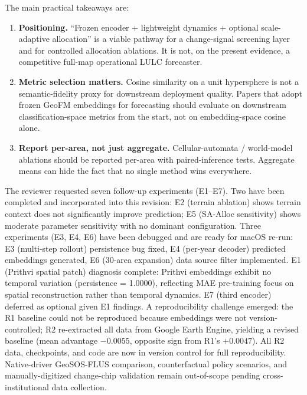 \documentclass{article}
\begin{document}
The main practical takeaways are:

\begin{enumerate}
\item \textbf{Positioning.} ``Frozen encoder + lightweight dynamics + optional scale-adaptive allocation'' is a viable pathway for a change-signal screening layer and for controlled allocation ablations. It is not, on the present evidence, a competitive full-map operational LULC forecaster.
\item \textbf{Metric selection matters.} Cosine similarity on a unit hypersphere is not a semantic-fidelity proxy for downstream deployment quality. Papers that adopt frozen GeoFM embeddings for forecasting should evaluate on downstream classification-space metrics from the start, not on embedding-space cosine alone.
\item \textbf{Report per-area, not just aggregate.} Cellular-automata / world-model ablations should be reported per-area with paired-inference tests. Aggregate means can hide the fact that no single method wins everywhere.
\end{enumerate}

The reviewer requested seven follow-up experiments (E1--E7). Two have been completed and incorporated into this revision: E2 (terrain ablation) shows terrain context does not significantly improve prediction; E5 (SA-Alloc sensitivity) shows moderate parameter sensitivity with no dominant configuration. Three experiments (E3, E4, E6) have been debugged and are ready for macOS re-run: E3 (multi-step rollout) persistence bug fixed, E4 (per-year decoder) predicted embeddings generated, E6 (30-area expansion) data source filter implemented. E1 (Prithvi spatial patch) diagnosis complete: Prithvi embeddings exhibit no temporal variation (persistence = 1.0000), reflecting MAE pre-training focus on spatial reconstruction rather than temporal dynamics. E7 (third encoder) deferred as optional given E1 findings. A reproducibility challenge emerged: the R1 baseline could not be reproduced because embeddings were not version-controlled; R2 re-extracted all data from Google Earth Engine, yielding a revised baseline (mean advantage $-0.0055$, opposite sign from R1's $+0.0047$). All R2 data, checkpoints, and code are now in version control for full reproducibility. Native-driver GeoSOS-FLUS comparison, counterfactual policy scenarios, and manually-digitized change-chip validation remain out-of-scope pending cross-institutional data collection.


\end{document}
